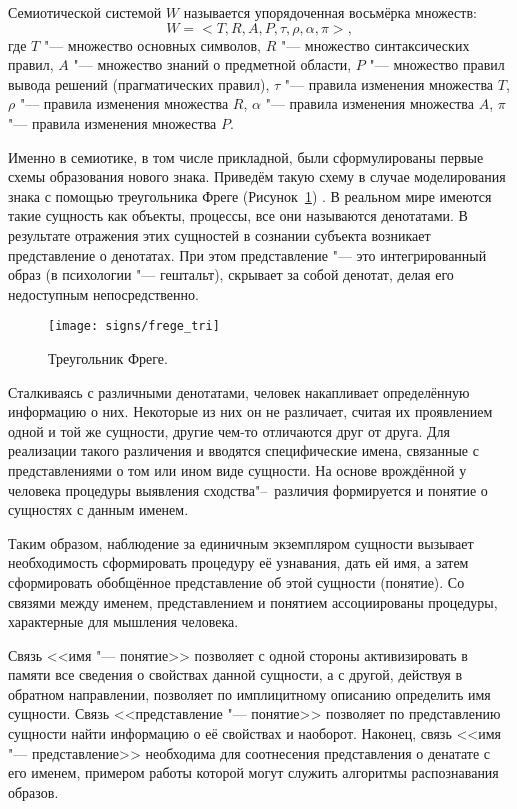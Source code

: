 \begin{Def}
	Семиотической системой $W$ называется упорядоченная восьмёрка множеств:
	\begin{equation}
		W=<T,R,A,P,\tau,\rho,\alpha,\pi>,
	\end{equation} 
	где	$T$ "--- множество основных символов, $R$ "--- множество синтаксических правил, $A$ "--- множество знаний о предметной области, $P$ "--- множество правил вывода решений (прагматических правил), $\tau$ "--- правила изменения множества $T$, $\rho$ "--- правила изменения множества $R$, $\alpha$ "--- правила изменения множества $A$, $\pi$ "--- правила изменения множества $P$.
\end{Def}

Именно в семиотике, в том числе прикладной, были сформулированы первые схемы образования нового знака. Приведём такую схему в случае моделирования знака с помощью треугольника Фреге (Рисунок~\ref{fg:frege_sign}) \cite{Frege2000,Pirs2000}. В реальном мире имеются такие сущность как объекты, процессы, все они называются денотатами. В результате отражения этих сущностей в сознании субъекта возникает представление о денотатах. При этом представление "--- это интегрированный образ (в психологии "--- гештальт), скрывает за собой денотат, делая его недоступным непосредственно.

\begin{figure}[h]
	\centering
	\texttt{[image: signs/frege\_tri]}
	\caption{Треугольник Фреге.}
	\label{fg:frege_sign}
\end{figure}

Сталкиваясь с различными денотатами, человек накапливает определённую информацию о них. Некоторые из них он не различает, считая их проявлением одной и той же сущности, другие чем-то отличаются друг от друга. Для реализации такого различения и вводятся специфические имена, связанные с представлениями о том или ином виде сущности. На основе врождённой у человека процедуры выявления сходства"--~различия формируется и понятие о сущностях с данным именем.

Таким образом, наблюдение за единичным экземпляром сущности вызывает необходимость сформировать процедуру её узнавания, дать ей имя, а затем сформировать обобщённое представление об этой сущности (понятие). Со связями между именем, представлением и понятием ассоциированы процедуры, характерные для мышления человека.

Связь <<имя "--- понятие>> позволяет с одной стороны активизировать в памяти все сведения о свойствах данной сущности, а с другой, действуя в обратном направлении, позволяет по имплицитному описанию определить имя сущности. Связь <<представление "--- понятие>> позволяет по представлению сущности найти информацию о её свойствах и наоборот. Наконец, связь <<имя "--- представление>> необходима для соотнесения представления о денатате с его именем, примером работы которой могут служить алгоритмы распознавания образов.

